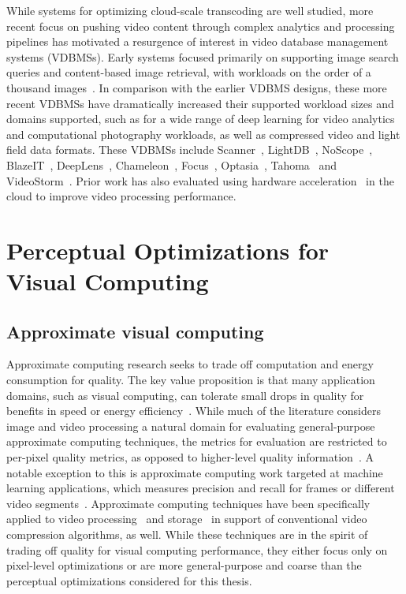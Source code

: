 While systems for optimizing cloud-scale transcoding are well studied, more recent focus on pushing video content through complex analytics and processing pipelines has motivated a resurgence of interest in video database management systems (VDBMSs).
Early systems focused primarily on supporting image search queries and content-based image retrieval, with workloads on the order of a thousand images~\cite{ogle1995chabot, faloutsos1994efficient, carson1999blobworld, chaudhuri1996optimizing, visualrank}.
In comparison with the earlier VDBMS designs, these more recent VDBMSs have dramatically increased their supported workload sizes and domains supported, such as for a wide range of deep learning for video analytics and computational photography workloads, as well as compressed video and light field data formats. These VDBMSs include Scanner~\cite{poms2018scanner}, LightDB~\cite{lightdb}, NoScope~\cite{noscope}, BlazeIT~\cite{blazeit}, DeepLens~\cite{deeplens}, Chameleon~\cite{chameleon18sigcomm},  Focus~\cite{focus18osdi}, Optasia~\cite{optasia2016lu}, Tahoma~\cite{anderson2018physical} and VideoStorm~\cite{videostorm}.
Prior work has also evaluated using hardware acceleration~\cite{asicclouds, liu2016greenvid, vbench} in the cloud to improve video processing performance.


\section{Perceptual Optimizations for Visual Computing}

\subsection{Approximate visual computing}
Approximate computing research seeks to trade off computation and energy consumption for quality.
The key value proposition is that many application domains, such as visual computing, can tolerate small drops in quality for benefits in speed or energy efficiency~\cite{8054698, sampson2011enerj}.
While much of the literature considers image and video processing a natural domain for evaluating general-purpose approximate computing techniques, the metrics for evaluation are restricted to per-pixel quality metrics, as opposed to higher-level quality information~\cite{sampson2011enerj,snnap,Guo:2016:HIS:2872362.2872413,8342234}.
A notable exception to this is approximate computing work targeted at machine learning applications, which measures precision and recall for frames or different video segments~\cite{snnap}.
Approximate computing techniques have been specifically applied to video processing~\cite{xu2018videochef} and storage~\cite{jevdjic2017approxvid} in support of conventional video compression algorithms, as well.
While these techniques are in the spirit of trading off quality for visual computing performance, they either focus only on pixel-level optimizations or are more general-purpose and coarse than the perceptual optimizations considered for this thesis.

